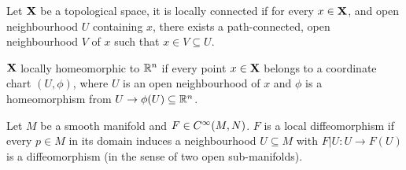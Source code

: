 \documentclass[../main-manifolds.tex]{subfiles}
\begin{document}
\begin{definition}\label{chp4:locally-path-connected-definition}
    Let ${\mathbf{X}}$ be a topological space, it is locally connected if for every $x\in{\mathbf{X}}$, and open neighbourhood $U$ containing $x$, there exists a path-connected, open neighbourhood $V$ of $x$ such that $x\in V\subseteq U$.
\end{definition}

\begin{definition}\label{chp4:locally-homeomorphic-definition}
    ${\mathbf{X}}$ locally homeomorphic to ${\mathbb{R}^n}$ if every point $x\in{\mathbf{X}}$ belongs to a coordinate chart $(U,\phi)$, where $U$ is an open neighbourhood of $x$ and $\phi$ is a homeomorphism from $U\to\phi(U)\subseteq{\mathbb{R}^n}$.
\end{definition}

\begin{definition}\label{lee-chp4:local-diffeomorphism-definition}
    Let $M$ be a smooth manifold and $F\in \cinf[M,N]$. $F$ is a local diffeomorphism if every $p\in M$ in its domain induces a neighbourhood $U\subseteq M$ with $F|U:U\to F(U)$ is a diffeomorphism (in the sense of two open sub-manifolds).
\end{definition}
\end{document}
